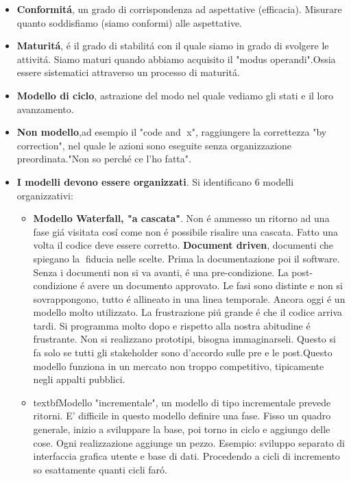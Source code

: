 \documentclass[a4paper,10pt] {article}
\begin{document}
\begin{itemize}
\begin{itemize}
	
	\item \textbf{Conformit\'a}, un grado di corrispondenza ad aspettative 
	(efficacia). Misurare quanto soddisfiamo (siamo conformi) alle aspettative.
	
	\item \textbf{Maturit\'a}, \'e il grado di stabilit\'a con il quale siamo 
	in grado di svolgere le attivit\'a. Siamo maturi quando abbiamo acquisito 
	il "modus operandi".Ossia essere sistematici attraverso un processo di 
	maturit\'a.
	
	\item \textbf{Modello di ciclo}, astrazione del modo nel quale vediamo gli 
	stati e il loro avanzamento.
	
	\item \textbf{Non modello},ad esempio il "code and x", raggiungere la 
	correttezza "by correction", nel quale le azioni sono eseguite senza 
	organizzazione preordinata."Non so perch\'e ce l'ho fatta".
	
	\item \textbf{I modelli devono essere organizzati}. Si identificano 6 
	modelli organizzativi:
	\begin{itemize}
	\item  \textbf{Modello Waterfall, "a cascata"}. Non \'e ammesso un ritorno 
	ad una fase gi\'a visitata cos\'i come non \'e possibile risalire una 
	cascata. Fatto una volta il codice deve essere corretto. 	
	\textbf{Document driven}, documenti che spiegano la fiducia nelle 
	scelte. Prima la documentazione poi il software. Senza i documenti
	non si va avanti, \'e una pre-condizione. La post-condizione \'e avere un 
	documento approvato. Le fasi sono distinte e non si sovrappongono, tutto 
	\'e allineato in una linea temporale. Ancora oggi \'e un modello
	molto utilizzato. La frustrazione pi\'u grande \'e che il codice arriva 
	tardi. Si programma molto dopo e rispetto alla nostra abitudine \'e 
	frustrante. Non si realizzano  prototipi, bisogna immaginarseli.
	Questo si fa solo se tutti gli stakeholder sono d'accordo sulle pre e le 
	post.Questo modello funziona in un mercato non troppo competitivo, 
	tipicamente negli appalti pubblici.


	\item textbf{Modello "incrementale"}, un modello di tipo incrementale 
	prevede ritorni. E' difficile in questo modello definire una fase.
	Fisso un quadro generale, inizio a sviluppare la base, poi torno in ciclo e 
	aggiungo delle cose. Ogni realizzazione aggiunge un pezzo. Esempio: 
	sviluppo separato di interfaccia grafica utente e base di dati. Procedendo 
	a cicli di incremento so esattamente quanti cicli far\'o. 
	

\end{itemize}
\end{itemize}
\end{itemize}
\end{document}
